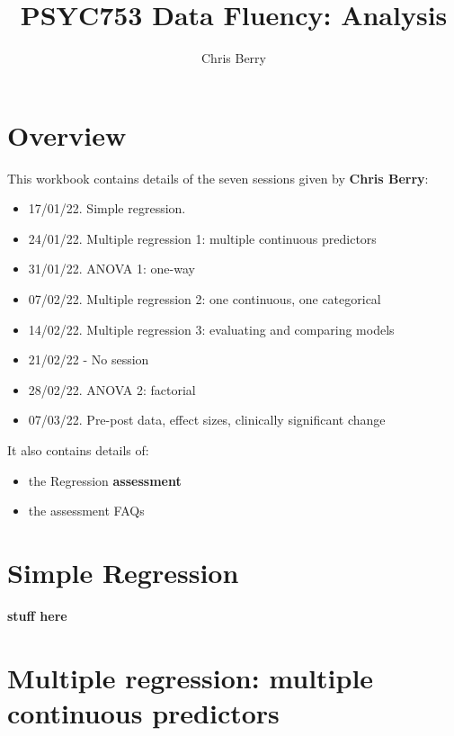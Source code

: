 \documentclass[
]{book}
\title{PSYC753 Data Fluency: Analysis}
\author{Chris Berry}
\date{}
\theoremstyle{definition}
\theoremstyle{definition}
\theoremstyle{definition}
\theoremstyle{definition}
\theoremstyle{remark}
\begin{document}
\maketitle

{
\setcounter{tocdepth}{1}
\tableofcontents
}
\hypertarget{overview}{%
\chapter*{Overview}\label{overview}}

This workbook contains details of the seven sessions given by \textbf{Chris Berry}:

\begin{itemize}
\item
  17/01/22. Simple regression.
\item
  24/01/22. Multiple regression 1: multiple continuous predictors
\item
  31/01/22. ANOVA 1: one-way
\item
  07/02/22. Multiple regression 2: one continuous, one categorical
\item
  14/02/22. Multiple regression 3: evaluating and comparing models
\item
  21/02/22 - No session
\item
  28/02/22. ANOVA 2: factorial
\item
  07/03/22. Pre-post data, effect sizes, clinically significant change
\end{itemize}

\hfill\break

It also contains details of:

\begin{itemize}
\item
  the Regression \textbf{assessment}
\item
  the assessment FAQs
\end{itemize}

\hfill\break

\hfill\break

\hypertarget{simple-regression}{%
\chapter{Simple Regression}\label{simple-regression}}

\textbf{stuff here}

\hypertarget{multiple1}{%
\chapter{Multiple regression: multiple continuous predictors}\label{multiple1}}
\end{document}
